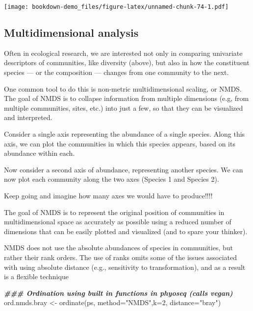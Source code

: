 \documentclass[
]{book}
\newenvironment{Shaded}{\begin{snugshade}}{\end{snugshade}}
\newcommand{\AttributeTok}[1]{\textcolor[rgb]{0.77,0.63,0.00}{#1}}
\newcommand{\DecValTok}[1]{\textcolor[rgb]{0.00,0.00,0.81}{#1}}
\newcommand{\DocumentationTok}[1]{\textcolor[rgb]{0.56,0.35,0.01}{\textbf{\textit{#1}}}}
\newcommand{\FunctionTok}[1]{\textcolor[rgb]{0.00,0.00,0.00}{#1}}
\newcommand{\NormalTok}[1]{#1}
\newcommand{\OtherTok}[1]{\textcolor[rgb]{0.56,0.35,0.01}{#1}}
\newcommand{\StringTok}[1]{\textcolor[rgb]{0.31,0.60,0.02}{#1}}
\begin{document}
\texttt{[image: bookdown-demo\_files/figure-latex/unnamed-chunk-74-1.pdf]}

\hypertarget{multidimensional-analysis}{%
\subsection{Multidimensional analysis}\label{multidimensional-analysis}}

Often in ecological research, we are interested not only in comparing univariate descriptors of communities, like diversity (above), but also in how the constituent species --- or the composition --- changes from one community to the next.

One common tool to do this is non-metric multidimensional scaling, or NMDS. The goal of NMDS is to collapse information from multiple dimensions (e.g, from multiple communities, sites, etc.) into just a few, so that they can be visualized and interpreted.

Consider a single axis representing the abundance of a single species. Along this axis, we can plot the communities in which this species appears, based on its abundance within each.

Now consider a second axis of abundance, representing another species. We can now plot each community along the two axes (Species 1 and Species 2).

Keep going and imagine how many axes we would have to produce!!!!

The goal of NMDS is to represent the original position of communities in multidimensional space as accurately as possible using a reduced number of dimensions that can be easily plotted and visualized (and to spare your thinker).

NMDS does not use the absolute abundances of species in communities, but rather their rank orders. The use of ranks omits some of the issues associated with using absolute distance (e.g., sensitivity to transformation), and as a result is a flexible technique

\begin{Shaded}
\begin{Highlighting}[]
    \DocumentationTok{\#\#\# Ordination using built in functions in phyoseq (calls vegan)    }
\NormalTok{ord.nmds.bray }\OtherTok{\textless{}{-}} \FunctionTok{ordinate}\NormalTok{(ps, }\AttributeTok{method=}\StringTok{"NMDS"}\NormalTok{,}\AttributeTok{k=}\DecValTok{2}\NormalTok{, }\AttributeTok{distance=}\StringTok{"bray"}\NormalTok{)}
\end{Highlighting}
\end{Shaded}
\end{document}
